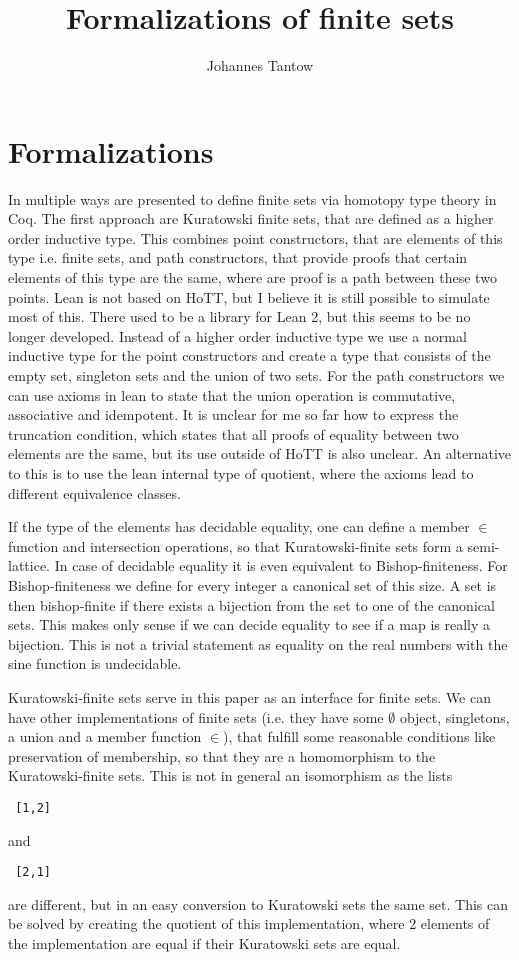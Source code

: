 \documentclass{article}
\title{Formalizations of finite sets}
\author{Johannes Tantow}
\begin{document}
\maketitle 
\section{Formalizations}
In \cite{HoTT-FinSets} multiple ways are presented to define finite sets via homotopy type theory in Coq. The first approach are Kuratowski finite sets, that are defined as a higher order inductive type. This combines point constructors, that are elements of this type i.e. finite sets, and path constructors, that provide proofs that certain elements of this type are the same, where are proof is a path between these two points.
Lean is not based on HoTT, but I believe it is still possible to simulate most of this. There used to be a library for Lean 2, but this seems to be no longer developed. Instead of a higher order inductive type we use a normal inductive type for the point constructors and create a type that consists of the empty set, singleton sets and the union of two sets. For the path constructors we can use axioms in lean to state that the union operation is commutative, associative and idempotent. It is unclear for me so far how to express the truncation condition, which states that all proofs of equality between two elements are the same, but its use outside of HoTT is also unclear.
An alternative to this is to use the lean internal type of quotient, where the axioms lead to different equivalence classes.

If the type of the elements has decidable equality, one can define a member $\in$ function and intersection operations, so that Kuratowski-finite sets form a semi-lattice. In case of decidable equality it is even equivalent to Bishop-finiteness. For Bishop-finiteness we define for every integer a canonical set of this size. A set is then bishop-finite if there exists a bijection from the set to one of the canonical sets. This makes only sense if we can decide equality to see if a map is really a bijection. This is not a trivial statement as equality on the real numbers with the sine function is undecidable.\cite{Richardson}

Kuratowski-finite sets serve in this paper as an interface for finite sets. We can have other implementations of finite sets (i.e. they have some $\emptyset$ object, singletons, a union and a member function $\in$), that fulfill some reasonable conditions like preservation of membership, so that they are a homomorphism to the Kuratowski-finite sets.
This is not in general an isomorphism as the lists \begin{verbatim} [1,2]\end{verbatim} and \begin{verbatim} [2,1]\end{verbatim}  are different, but in an easy conversion to Kuratowski sets the same set. This can be solved by creating the quotient of this implementation, where 2 elements of the implementation are equal if their Kuratowski sets are equal.
\end{document}
